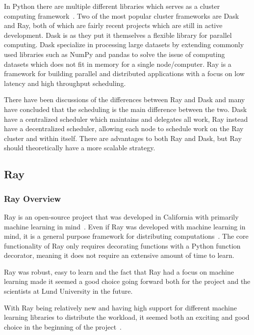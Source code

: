 \documentclass[12pt, a4paper]{article}
\begin{document}
In Python there are multiple different libraries which serves as a cluster computing framework~\cite{PythonClusterFrameworks}.
Two of the most popular cluster frameworks are Dask and Ray, both of which are fairly recent projects which are still in active development.
Dask is as they put it themselves a flexible library for parallel computing. 
Dask specialize in processing large datasets by extending commonly used libraries such as NumPy and pandas to solve the issue of computing datasets which does not fit in memory for a single node/computer.
Ray is a framework for building parallel and distributed applications with a focus on low latency and high throughput scheduling.

There have been discussions of the differences between Ray and Dask and many have concluded that the scheduling is the main difference between the two.
Dask have a centralized scheduler which maintains and delegates all work, Ray instead have a decentralized scheduler, allowing each node to schedule work on the Ray cluster and within itself.
There are advantages to both Ray and Dask, but Ray should theoretically have a more scalable strategy.


\subsection{Ray}

\subsubsection{Ray Overview}

Ray is an open-source project that was developed in California with primarily machine learning in mind~\cite{nishihara2017realtime, moritz2018ray}. 
Even if Ray was developed with machine learning in mind, it is a general purpose framework for distributing computations~\cite{ray:whatIsRay}.
The core functionality of Ray only requires decorating functions with a Python function decorator, meaning it does not require an extensive amount of time to learn.

Ray was robust, easy to learn and the fact that Ray had a focus on machine learning made it seemed a good choice going forward both for the project and the scientists at Lund University in the future.

With Ray being relatively new and having high support for different machine learning libraries to distribute the workload, it seemed both an exciting and good choice in the beginning of the project~\cite{ray:RaySGD, ray:Rayrllib, ray:RayTune, ray:RaySklearn}. 
\end{document}
